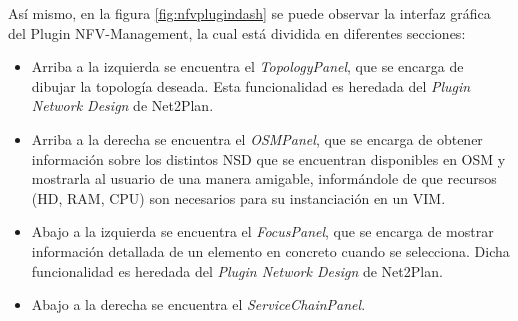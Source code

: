Así mismo, en la figura \ref{fig:nfvplugindash} se puede observar la interfaz gráfica del Plugin NFV-Management, la cual está dividida en diferentes secciones:

\begin{itemize}
	\item Arriba a la izquierda se encuentra el \textit{TopologyPanel}, que se encarga de dibujar la topología deseada. Esta funcionalidad es heredada del \textit{Plugin Network Design} de Net2Plan.
	
	\item Arriba a la derecha se encuentra el \textit{OSMPanel}, que se encarga de obtener información sobre los distintos NSD que se encuentran disponibles en OSM y mostrarla al usuario de una manera amigable, informándole de que recursos (HD, RAM, CPU) son necesarios para su instanciación en un VIM.
	
	\item Abajo a la izquierda se encuentra el \textit{FocusPanel}, que se encarga de mostrar información detallada de un elemento en concreto cuando se selecciona. Dicha funcionalidad es heredada del \textit{Plugin Network Design} de Net2Plan.
	
	\item Abajo a la derecha se encuentra el \textit{ServiceChainPanel}.
\end{itemize}


\cleardoublepage